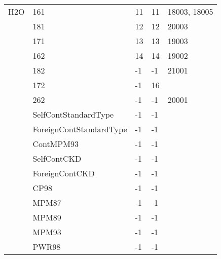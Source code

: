 \begin{longtable}{lllll}
  H2O& 161&  11&    11&  18003, 18005\\
     & 181&  12&    12&  20003\\
     & 171&  13&    13&  19003\\
     & 162&  14&    14&  19002\\
     & 182&  -1&    -1&  21001\\
     & 172&  -1&    16&       \\
     & 262&  -1&    -1&  20001\\
     &SelfContStandardType&             -1&  -1 & \\      
     &ForeignContStandardType&          -1&  -1 & \\      
     &ContMPM93&                        -1&  -1 & \\      
     &SelfContCKD&                      -1&  -1 & \\      
     &ForeignContCKD&                   -1&  -1 & \\      
     &CP98&                             -1&  -1 & \\      
     &MPM87&                            -1&  -1 & \\      
     &MPM89&                            -1&  -1 & \\      
     &MPM93&                            -1&  -1 & \\      
     &PWR98&                            -1&  -1 & \\  



\end{longtable}
